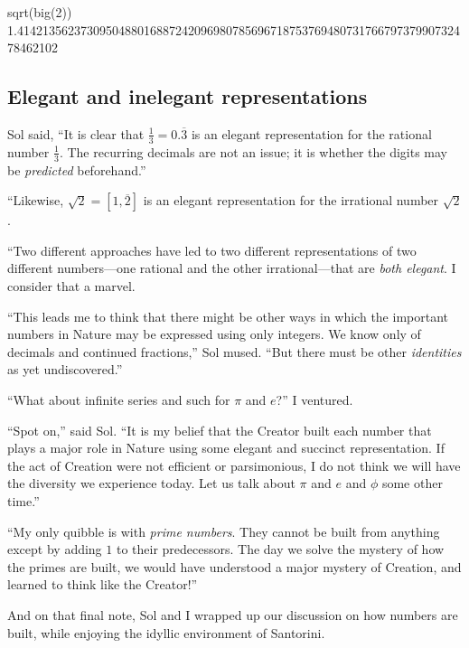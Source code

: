\documentclass[
  a4paper,
]{article}
\newenvironment{Shaded}{\begin{snugshade}}{\end{snugshade}}
\newcommand{\FloatTok}[1]{\textcolor[rgb]{0.75,0.75,0.82}{#1}}
\newcommand{\FunctionTok}[1]{\textcolor[rgb]{0.94,0.94,0.56}{#1}}
\newcommand{\NormalTok}[1]{\textcolor[rgb]{0.80,0.80,0.80}{#1}}
\begin{document}
\begin{Shaded}
\begin{Highlighting}[]
\FunctionTok{sqrt}\NormalTok{(}\FunctionTok{big}\NormalTok{(}\FloatTok{2}\NormalTok{))}
\FloatTok{1.414213562373095048801688724209698078569671875376948073176679737990732478462102}
\end{Highlighting}
\end{Shaded}

\subsection{Elegant and inelegant
representations}\label{elegant-and-inelegant-representations}

Sol said, ``It is clear that \(\tfrac{1}{3} = 0.\overline{3}\) is an
elegant representation for the rational number \(\tfrac{1}{3}\). The
recurring decimals are not an issue; it is whether the digits may be
\emph{predicted} beforehand.''

``Likewise, \(\sqrt{2} = [1, \overline{2}]\) is an elegant
representation for the irrational number \(\sqrt{2}\).

``Two different approaches have led to two different representations of
two different numbers---one rational and the other irrational---that are
\emph{both elegant}. I consider that a marvel.

``This leads me to think that there might be other ways in which the
important numbers in Nature may be expressed using only integers. We
know only of decimals and continued fractions,'' Sol mused. ``But there
must be other \emph{identities} as yet undiscovered.''

``What about infinite series and such for \(\pi\) and \(e\)?'' I
ventured.

``Spot on,'' said Sol. ``It is my belief that the Creator built each
number that plays a major role in Nature using some elegant and succinct
representation. If the act of Creation were not efficient or
parsimonious, I do not think we will have the diversity we experience
today. Let us talk about \(\pi\) and \(e\) and \(\phi\) some other
time.''

``My only quibble is with \emph{prime numbers}. They cannot be built
from anything except by adding \(1\) to their predecessors. The day we
solve the mystery of how the primes are built, we would have understood
a major mystery of Creation, and learned to think like the Creator!''

And on that final note, Sol and I wrapped up our discussion on how
numbers are built, while enjoying the idyllic environment of Santorini.
\end{document}
